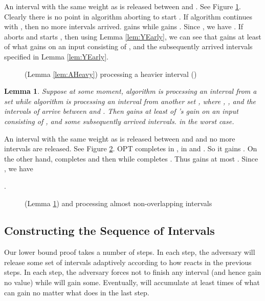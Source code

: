 \documentclass[11pt]{article}
\newtheorem{lemma}{Lemma}[section]
\newcommand{\qed}{\hspace*{\fill}\par\medskip}
\newenvironment{proof}{\noindent{\it Proof. }\ignorespaces}{\qed}
\begin{document}
\begin{proof}
An interval  with the same weight as  is released
between  and .
See Figure \ref{fig:aheavy}.
Clearly there is no point in algorithm  aborting  to
start .
If algorithm  continues with ,
then no more intervals arrived.
 gains 
while  gains  .
Since ,
we have .
If  aborts  and starts ,
then using Lemma \ref{lem:YEarly}, we can see that
 gains at least  of what  gains
on an input consisting of ,  and the subsequently
arrived intervals specified in Lemma \ref{lem:YEarly}.
\end{proof}

\begin{figure}
\centerline{ \epsfysize=0.9in  }
\caption{(Lemma \ref{lem:AHeavy})  processing a heavier interval ()}
\label{fig:aheavy}
\end{figure}

\begin{lemma} \label{lem:ABSeparate}
Suppose at some moment, 
algorithm  is processing an interval  from
a set  
while algorithm  is processing an interval  from
another set , where ,
, 
and the intervals of  arrive between  and .
Then  gains at least  of 's
gain on an input consisting of
,  and some subsequently arrived intervals.
in the worst case.
\end{lemma}

\begin{proof}
An interval  with the same weight as  is
released between  and 
and no more intervals are released.
See Figure \ref{fig:abseparate}.
OPT completes  in ,  in  and .
So it gains 
.
On the other hand,  completes  and then 
while  completes .
Thus  gains at most 
.
Since , we have

.
\end{proof}

\begin{figure}
\centerline{ \epsfysize=0.9in  }
\caption{(Lemma \ref{lem:ABSeparate})  and  processing
almost non-overlapping intervals}
\label{fig:abseparate}
\end{figure}

\subsection{Constructing the Sequence of Intervals}

Our lower bound proof takes a number of steps.
In each step, the adversary will release some set of intervals
 adaptively according to how  reacts
in the previous steps.
In each step, the adversary forces  not to finish any interval 
(and hence gain no value) while  will gain some.
Eventually,  will accumulate at least  times of
what  can gain no matter what  does in the last step.
\end{document}
